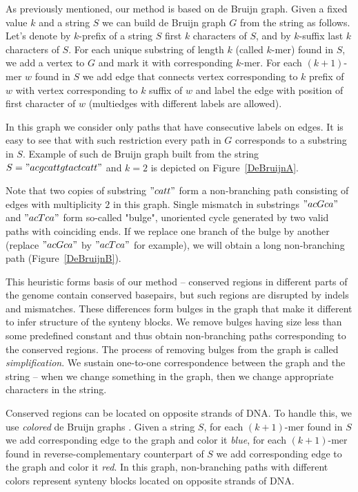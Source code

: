 \documentclass[a4paper,12pt]{scrartcl}
\begin{document}
As previously mentioned, our method is based on de Bruijn graph.
Given a fixed value \(k\) and a string \(S\) we can build de Bruijn graph \(G\) from the string as follows.
Let's denote by \(k\)-prefix of a string \(S\) first \(k\) characters of \(S\), and by \(k\)-suffix last \(k\) characters of \(S\).
For each unique substring of length \(k\) (called \(k\)-mer) found in \(S\), we add a vertex to \(G\) and mark it with
corresponding \(k\)-mer. For each \((k + 1)\)-mer \(w\) found in \(S\) we add edge that connects vertex corresponding to
\(k\) prefix of \(w\) with vertex corresponding to \(k\) suffix of \(w\) and label the edge with position of first character of \(w\)
(multiedges with different labels are allowed).

In this graph we consider only paths that have consecutive labels on edges. It is easy to see that with such restriction every path in \(G\)
corresponds to a substring in \(S\). Example of such de Bruijn graph built from the string \(S = "acgcattgtactcatt" \) and \(k = 2\) is
depicted on Figure~\ref{DeBruijnA}.

Note that two copies of substring \("catt"\) form a non-branching path consisting of edges with multiplicity \(2\) in this graph. Single
mismatch in substrings \("acGca"\) and \("acTca"\) form so-called "bulge", unoriented cycle generated by two valid paths with
coinciding ends. If we replace one branch of the bulge by another (replace \("acGca"\) by \("acTca"\) for example), we will obtain
a long non-branching path (Figure~\ref{DeBruijnB}).

This heuristic forms basis of our method -- conserved regions in different parts of the genome contain conserved basepairs, but
such regions are disrupted by indels and mismatches. These differences form bulges in the graph that make it different to infer
structure of the synteny blocks. We remove bulges having size less than some predefined constant and thus obtain non-branching
paths corresponding to the conserved regions. The process of removing bulges from the graph is called \textit{simplification}. We
sustain one-to-one correspondence between the graph and the string -- when we change something in the graph, then we change
appropriate characters in the string.

Conserved regions can be located on opposite strands of DNA. To handle this, we use \textit{colored} de Bruijn graphs \cite{Iqbal2012}.
Given a string \(S\), for each \((k + 1)\)-mer found in \(S\) we add corresponding edge to the graph and color it \textit{blue}, for 
each \((k + 1)\)-mer found in reverse-complementary counterpart of \(S\) we add corresponding edge to the graph and color it \textit{red}.
In this graph, non-branching paths with different colors represent synteny blocks located on opposite strands of DNA.
\end{document}
